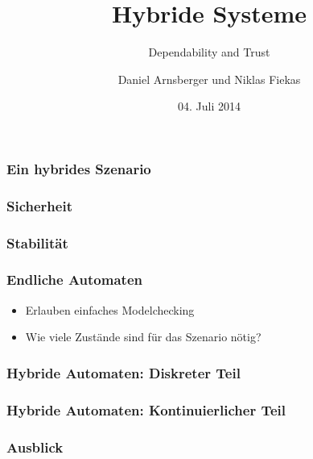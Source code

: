 \documentclass[ngerman]{beamer}
\title{Hybride Systeme}
\subtitle{Dependability and Trust}
\author{Daniel Arnsberger und Niklas Fiekas}
\institute{Institut für Informatik}
\date{04. Juli 2014}
\begin{document}
\begin{frame}
    \titlepage
\end{frame}

\begin{frame}
    \frametitle{Ein hybrides Szenario}
\end{frame}

\begin{frame}
    \frametitle{Sicherheit}
\end{frame}

\begin{frame}
    \frametitle{Stabilität}
\end{frame}

\begin{frame}
    \frametitle{Endliche Automaten}

    \begin{itemize}
        \item Erlauben einfaches Modelchecking
        \item Wie viele Zustände sind für das Szenario nötig?
    \end{itemize}
\end{frame}

\begin{frame}
    \frametitle{Hybride Automaten: Diskreter Teil}
\end{frame}

\begin{frame}
    \frametitle{Hybride Automaten: Kontinuierlicher Teil}
\end{frame}

\begin{frame}
    \frametitle{Ausblick}
\end{frame}
\end{document}

